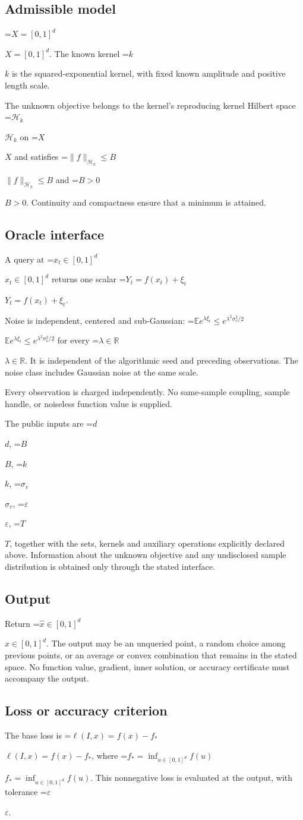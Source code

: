 \documentclass[10pt,a4paper]{article}
\newcommand{\AtlasMath}[1]{\par\begingroup\centering\setbox0=\hbox{$\displaystyle #1$}\ifdim\wd0>1.4\linewidth\typeout{ATLAS WIDE FORMULA: \the\wd0}\fi\ifdim\wd0>\linewidth\resizebox{\linewidth}{!}{\box0}\else\box0\fi\par\endgroup}
\newcommand{\AtlasInlineMath}[1]{\begingroup\setbox0=\hbox{$#1$}\ifdim\wd0>.4\linewidth\endgroup\AtlasMath{#1}\else\endgroup$#1$\fi}
\begin{document}
\subsection{Admissible model}
\AtlasInlineMath{X=[0,1]^d}. The known kernel \AtlasInlineMath{k} is the squared-exponential kernel, with fixed known amplitude and positive length scale.

The unknown objective belongs to the kernel's reproducing kernel Hilbert space \AtlasInlineMath{\mathcal{H}_k} on \AtlasInlineMath{X} and satisfies \AtlasInlineMath{\|f\|_{\mathcal{H}_k}\le B} and \AtlasInlineMath{B>0}. Continuity and compactness ensure that a minimum is attained.

\subsection{Oracle interface}
A query at \AtlasInlineMath{x_t\in [0,1]^d} returns one scalar \AtlasInlineMath{Y_t=f(x_t)+\xi_t}.

Noise is independent, centered and sub-Gaussian: \AtlasInlineMath{\mathbb{E} e^{\lambda\xi_t}\le e^{\lambda^2 \sigma_v^2/2}} for every \AtlasInlineMath{\lambda\in\mathbb{R}}. It is independent of the algorithmic seed and preceding observations. The noise class includes Gaussian noise at the same scale.

Every observation is charged independently. No same-sample coupling, sample handle, or noiseless function value is supplied.

The public inputs are \AtlasInlineMath{d}, \AtlasInlineMath{B}, \AtlasInlineMath{k}, \AtlasInlineMath{\sigma_v}, \AtlasInlineMath{\varepsilon}, \AtlasInlineMath{T}, together with the sets, kernels and auxiliary operations explicitly declared above. Information about the unknown objective and any undisclosed sample distribution is obtained only through the stated interface.

\subsection{Output}
Return \AtlasInlineMath{\widehat{x}\in [0,1]^d}. The output may be an unqueried point, a random choice among previous points, or an average or convex combination that remains in the stated space. No function value, gradient, inner solution, or accuracy certificate must accompany the output.

\subsection{Loss or accuracy criterion}
The base loss is \AtlasInlineMath{\ell(I,x)=f(x)-f_*}, where \AtlasInlineMath{f_*=\inf_{u\in [0,1]^d}f(u)}. This nonnegative loss is evaluated at the output, with tolerance \AtlasInlineMath{\varepsilon}.
\end{document}
